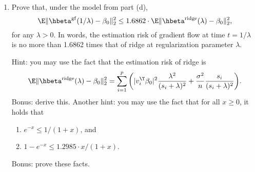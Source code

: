 \documentclass{article}
\begin{document}
\begin{enumerate}[label=(\alph*)]
\item Prove that, under the model from part (d), 
  \marginpar{\small [5 pts]}
  \[
  \E \|\hbeta^\gf(1/\lambda) - \beta_0\|_2^2 \leq 1.6862 \cdot \E
  \|\hbeta^\ridge(\lambda) - \beta_0\|_2^2,
  \]
  for any $\lambda > 0$. In words, the estimation risk of gradient flow at time
  $t = 1/\lambda$ is no more than 1.6862 times that of ridge at regularization 
  parameter $\lambda$.

  Hint: you may use the fact that the estimation risk of ridge is 
  \[
  \E \|\hbeta^\ridge(\lambda) - \beta_0\|_2^2 = \sum_{i=1}^p \bigg( |v_i^\T 
  \beta_0|^2 \frac{\lambda^2}{(s_i + \lambda)^2} + \frac{\sigma^2}{n}
  \frac{s_i}{(s_i + \lambda)^2} \bigg). 
  \]
  Bonus: derive this. Another hint: you may use the fact that for all $x \geq
  0$, it  
  holds that 
  \begin{enumerate}[label=(\roman*)]
  \item $e^{-x} \leq 1/(1+x)$, and
  \item $1-e^{-x} \leq 1.2985 \cdot x / (1+x)$.
  \end{enumerate}
  Bonus: prove these facts.
\end{enumerate}
\end{document}
